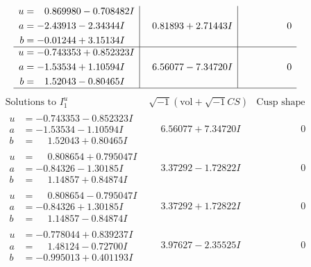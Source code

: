 \documentclass[1p]{elsarticle_modified}
\theoremstyle{definition}
\newcommand{\I}{\sqrt{-1}}
\begin{document}
$$\begin{array}{c|c|c}
\begin{aligned}
u &= \phantom{-}0.869980 - 0.708482 I \\
a &= -2.43913 - 2.34344 I \\
b &= -0.01244 + 3.15134 I\end{aligned}
 & \phantom{-}0.81893 + 2.71443 I & \phantom{-0.000000 } 0 \\ \hline\begin{aligned}
u &= -0.743353 + 0.852323 I \\
a &= -1.53534 + 1.10594 I \\
b &= \phantom{-}1.52043 - 0.80465 I\end{aligned}
 & \phantom{-}6.56077 - 7.34720 I & \phantom{-0.000000 } 0\\
 \hline 
 \end{array}$$\newpage$$\begin{array}{c|c|c}  
\text{Solutions to }I^u_{1}& \I (\text{vol} + \sqrt{-1}CS) & \text{Cusp shape}\\
 \hline 
\begin{aligned}
u &= -0.743353 - 0.852323 I \\
a &= -1.53534 - 1.10594 I \\
b &= \phantom{-}1.52043 + 0.80465 I\end{aligned}
 & \phantom{-}6.56077 + 7.34720 I & \phantom{-0.000000 } 0 \\ \hline\begin{aligned}
u &= \phantom{-}0.808654 + 0.795047 I \\
a &= -0.84326 - 1.30185 I \\
b &= \phantom{-}1.14857 + 0.84874 I\end{aligned}
 & \phantom{-}3.37292 - 1.72822 I & \phantom{-0.000000 } 0 \\ \hline\begin{aligned}
u &= \phantom{-}0.808654 - 0.795047 I \\
a &= -0.84326 + 1.30185 I \\
b &= \phantom{-}1.14857 - 0.84874 I\end{aligned}
 & \phantom{-}3.37292 + 1.72822 I & \phantom{-0.000000 } 0 \\ \hline\begin{aligned}
u &= -0.778044 + 0.839237 I \\
a &= \phantom{-}1.48124 - 0.72700 I \\
b &= -0.995013 + 0.401193 I\end{aligned}
 & \phantom{-}3.97627 - 2.35525 I & \phantom{-0.000000 } 0 \\ \hline\begin{aligned}

\end{aligned}
\end{array}$$
\end{document}
